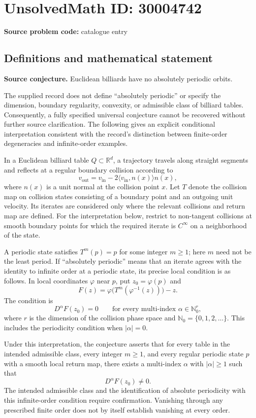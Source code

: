 \documentclass[11pt]{article}
\newcommand{\N}{\mathbb{N}}
\newcommand{\R}{\mathbb{R}}
\begin{document}
\section*{UnsolvedMath ID: 30004742}
\textbf{Source problem code:} catalogue entry
\subsection{Definitions and mathematical statement}
\textbf{Source conjecture.} Euclidean billiards have no absolutely periodic orbits.

The supplied record does not define ``absolutely periodic'' or specify the dimension, boundary regularity, convexity, or admissible class of billiard tables. Consequently, a fully specified universal conjecture cannot be recovered without further source clarification. The following gives an explicit conditional interpretation consistent with the record's distinction between finite-order degeneracies and infinite-order examples.

In a Euclidean billiard table \(Q\subset\R^d\), a trajectory travels along straight segments and reflects at a regular boundary collision according to
\[
 v_{\mathrm{out}}=v_{\mathrm{in}}-2\langle v_{\mathrm{in}},n(x)\rangle n(x),
\]
where \(n(x)\) is a unit normal at the collision point \(x\). Let \(T\) denote the collision map on collision states consisting of a boundary point and an outgoing unit velocity. Its iterates are considered only where the relevant collisions and return map are defined. For the interpretation below, restrict to non-tangent collisions at smooth boundary points for which the required iterate is \(C^\infty\) on a neighborhood of the state.

A periodic state satisfies \(T^m(p)=p\) for some integer \(m\geq1\); here \(m\) need not be the least period. If ``absolutely periodic'' means that an iterate agrees with the identity to infinite order at a periodic state, its precise local condition is as follows. In local coordinates \(\varphi\) near \(p\), put \(z_0=\varphi(p)\) and
\[
 F(z)=\varphi\bigl(T^m(\varphi^{-1}(z))\bigr)-z.
\]
The condition is
\[
 D^\alpha F(z_0)=0
 \qquad\text{for every multi-index }\alpha\in\N_0^r,
\]
where \(r\) is the dimension of the collision phase space and \(\N_0=\{0,1,2,\ldots\}\). This includes the periodicity condition when \(|\alpha|=0\).

Under this interpretation, the conjecture asserts that for every table in the intended admissible class, every integer \(m\geq1\), and every regular periodic state \(p\) with a smooth local return map, there exists a multi-index \(\alpha\) with \(|\alpha|\geq1\) such that
\[
 D^\alpha F(z_0)\ne0.
\]
The intended admissible class and the identification of absolute periodicity with this infinite-order condition require confirmation. Vanishing through any prescribed finite order does not by itself establish vanishing at every order.
\end{document}
